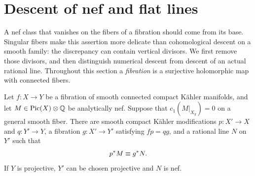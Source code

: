 \section{Descent of nef and flat lines}\label{sec:descent}

A nef class that vanishes on the fibers of a fibration should come from
its base.  Singular fibers make this assertion more delicate than
cohomological descent on a smooth family: the discrepancy can contain
vertical divisors.  We first remove those divisors, and then distinguish
numerical descent from descent of an actual rational line.  Throughout
this section a \emph{fibration} is a surjective holomorphic map with
connected fibers.

\begin{proposition}\label{desc:nef}
Let $f:X\to Y$ be a fibration of smooth connected compact K\"ahler
manifolds, and let $M\in\operatorname{Pic}(X)\otimes\mathbb Q$ be analytically nef.
Suppose that $c_1(M|_{X_y})=0$ on a general smooth fiber.
There are smooth compact K\"ahler modifications $p:X'\to X$ and
$q:Y'\to Y$, a fibration $g:X'\to Y'$ satisfying $fp=qg$, and a
rational line $N$ on $Y'$ such that
\begin{equation}\label{desc:numerical-identity}
                 p^*M\equiv g^*N.
\end{equation}
If $Y$ is projective, $Y'$ can be chosen projective and $N$ is nef.
\end{proposition}


